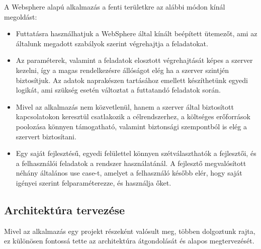 
A Websphere alapú alkalmazás a fenti területkre az alábbi módon kínál megoldást:
\begin{itemize}
	\item Futtatásra használhatjuk a WebSphere által kínált beépített ütemezőt, ami az általunk megadott szabályok szerint végrehajtja a feladatokat.
	
	\item Az paraméterek, valamint a feladatok elosztott végrehajtását képes a szerver kezelni, így a magas rendelkezésre állóságot elég ha a szerver szintjén biztosítjuk. Az adatok naprakészen tartásához emellett készíthetünk egyedi logikát, ami szükség esetén változtat a futtatandó feladatok során.
	
	\item Mivel az alkalmazás nem közvetlenül, hanem a szerver által biztosított kapcsolatokon keresztül csatlakozik a célrendszerhez, a költséges erőforrások poolozása könnyen támogatható, valamint biztonsági szempontból is elég a szervert biztosítani.
	
	\item Egy saját fejlesztésű, egyedi felülettel könnyen szétválaszthatók a fejlesztői, és a felhasználói feladatok a rendszer használatánál. A fejlesztő megvalósított néhány általános use case-t, amelyet a felhasználó később elér, hogy saját igényei szerint felparaméterezze, és használja őket. 
	
\end{itemize}

\subsection{Architektúra tervezése}

Mivel az alkalmazás egy projekt részeként valósult meg, többen dolgoztunk rajta, ez különösen fontossá tette az architektúra átgondolását és alapos megtervezését. 

